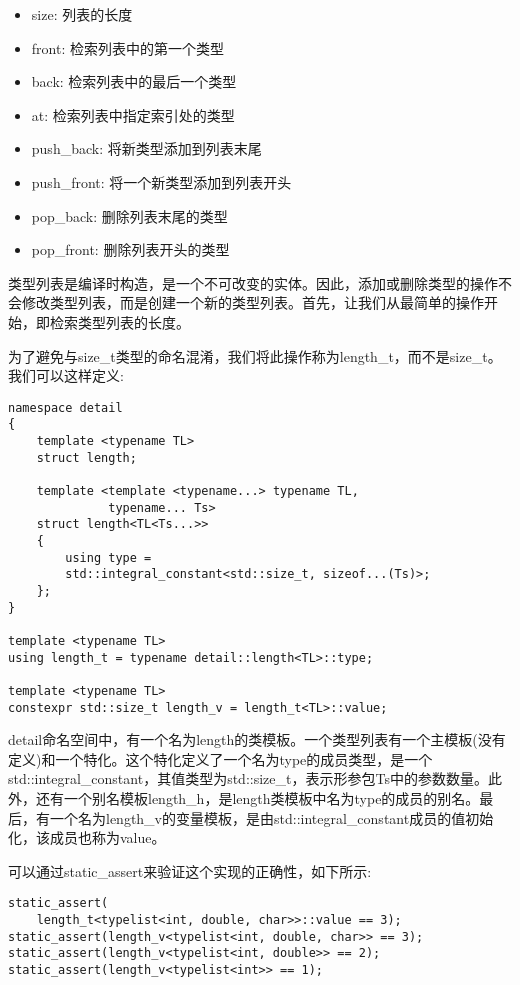 \begin{itemize}
\item
size: 列表的长度

\item
front: 检索列表中的第一个类型

\item
back: 检索列表中的最后一个类型

\item
at: 检索列表中指定索引处的类型

\item
push\_back: 将新类型添加到列表末尾

\item
push\_front: 将一个新类型添加到列表开头

\item
pop\_back: 删除列表末尾的类型

\item
pop\_front: 删除列表开头的类型
\end{itemize}

类型列表是编译时构造，是一个不可改变的实体。因此，添加或删除类型的操作不会修改类型列表，而是创建一个新的类型列表。首先，让我们从最简单的操作开始，即检索类型列表的长度。

为了避免与size\_t类型的命名混淆，我们将此操作称为length\_t，而不是size\_t。我们可以这样定义:

\begin{lstlisting}[style=styleCXX]
namespace detail
{
	template <typename TL>
	struct length;
	
	template <template <typename...> typename TL,
			  typename... Ts>
	struct length<TL<Ts...>>
	{
		using type =
		std::integral_constant<std::size_t, sizeof...(Ts)>;
	};
}

template <typename TL>
using length_t = typename detail::length<TL>::type;

template <typename TL>
constexpr std::size_t length_v = length_t<TL>::value;
\end{lstlisting}

detail命名空间中，有一个名为length的类模板。一个类型列表有一个主模板(没有定义)和一个特化。这个特化定义了一个名为type的成员类型，是一个std::integral\_constant，其值类型为std::size\_t，表示形参包Ts中的参数数量。此外，还有一个别名模板length\_h，是length类模板中名为type的成员的别名。最后，有一个名为length\_v的变量模板，是由std::integral\_constant成员的值初始化，该成员也称为value。

可以通过static\_assert来验证这个实现的正确性，如下所示:

\begin{lstlisting}[style=styleCXX]
static_assert(
	length_t<typelist<int, double, char>>::value == 3);
static_assert(length_v<typelist<int, double, char>> == 3);
static_assert(length_v<typelist<int, double>> == 2);
static_assert(length_v<typelist<int>> == 1);
\end{lstlisting}

